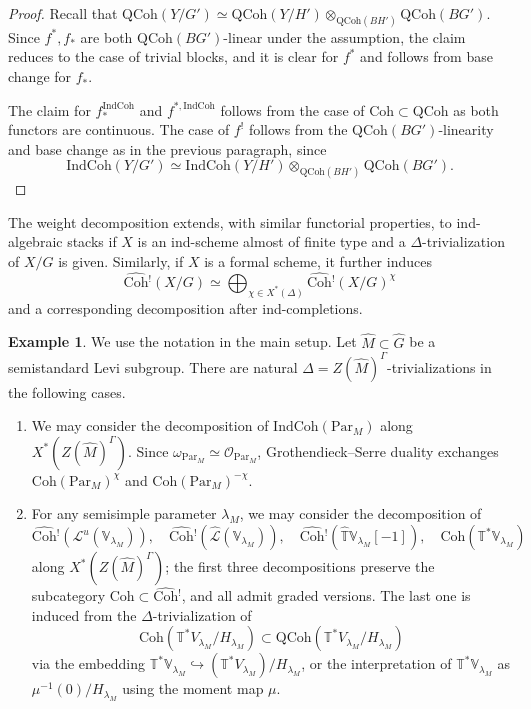 \documentclass{amsart}
\theoremstyle{definition}
\newtheorem{example}[theorem]{Example}
\theoremstyle{remark}
\numberwithin{equation}{section}
\newcommand{\mc}{\mathcal}
\newcommand{\wh}{\widehat}
\newcommand{\Par}{\mathrm{Par}}
\newcommand{\IndCoh}{\mathrm{IndCoh}}
\newcommand{\QCoh}{\mathrm{QCoh}}
\newcommand{\Coh}{\mathrm{Coh}}
\newcommand{\V}{\mathbb{V}}
\newcommand{\T}{\mathbb{T}}
\begin{document}
\begin{proof}
Recall that $\QCoh(Y/G')\simeq \QCoh(Y/H')\otimes_{\QCoh(BH')}\QCoh(BG')$. 
Since $f^*, f_*$ are both $\QCoh(BG')$-linear under the assumption, the claim reduces to the case of trivial blocks, and it is clear for $f^*$ and follows from base change for $f_*$. 

The claim for $f_*^{\IndCoh}$ and $f^{*,\IndCoh}$ follows from the case of $\Coh\subset \QCoh$ as both functors are continuous. The case of $f^!$ follows from the $\QCoh(BG')$-linearity and base change as in the previous paragraph, since
\[
\IndCoh(Y/G')\simeq \IndCoh(Y/H')\otimes_{\QCoh(BH')}\QCoh(BG'). 
\]
\end{proof}

The weight decomposition extends, with similar functorial properties, to ind-algebraic stacks if $X$ is an ind-scheme almost of finite type and a $\Delta$-trivialization of $X/G$ is given. 
Similarly, if $X$ is a formal scheme, it further induces
\[
\wh{\Coh}{}^!(X/ G) \simeq \bigoplus_{\chi\in X^*(\Delta)}\wh{\Coh}{}^!(X/ G)^\chi 
\]
and a corresponding decomposition after ind-completions. 

\begin{example}
We use the notation in the main setup. Let $\wh M \subset \wh G$ be a semistandard Levi subgroup. There are natural $\Delta=Z(\wh M)^\Gamma$-trivializations in the following cases. 
\begin{enumerate}
    \item We may consider the decomposition of $\IndCoh(\Par_M)$ along $X^*(Z(\wh M)^\Gamma)$. Since $\omega_{\Par_M}\simeq \mc O_{\Par_M}$, Grothendieck--Serre duality exchanges $\Coh(\Par_M)^{\chi}$ and $\Coh(\Par_M)^{-\chi}$. 
    \item For any semisimple parameter $\lambda_M$, we may consider the decomposition of 
    \[ 
    \wh{\Coh}{}^!(\mc L^u(\V_{\lambda_M})), \quad \wh{\Coh}{}^!(\wh{\mc L}(\V_{\lambda_M})), \quad \wh{\Coh}{}^!(\widehat{\T}\V_{\lambda_M}[-1]), \quad \Coh(\T^* \V_{\lambda_M})
    \]
    along $X^*(Z(\wh M)^\Gamma)$; the first three decompositions preserve the subcategory $\Coh\subset \wh{\Coh}{}^!$, and all admit graded versions. The last one is induced from the $\Delta$-trivialization of 
    \[
    \Coh(\T^* V_{\lambda_M} /H_{\lambda_M})\subset \QCoh(\T^* V_{\lambda_M} /H_{\lambda_M})
    \]
    via the embedding $\T^*\V_{\lambda_M} \hookrightarrow (\T^*V_{\lambda_M})/H_{\lambda_M}$, or the interpretation of $\T^* \V_{\lambda_M}$ as $\mu^{-1}(0)/H_{\lambda_M}$ using the moment map $\mu$.  
\end{enumerate}
\end{example}
\end{document}
